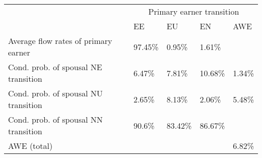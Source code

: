 \documentclass{article}
\begin{document}
\begin{tabular}{lllll}
\toprule
\multicolumn{1}{c}{ } & \multicolumn{4}{c}{Primary earner transition} \\
\cmidrule(l{3pt}r{3pt}){2-5}
 & EE & EU & EN & AWE\\
\midrule
Average flow rates of primary earner & 97.45\% & 0.95\% & 1.61\% & \\
\midrule
Cond. prob. of spousal NE transition & 6.47\% & 7.81\% & 10.68\% & 1.34\%\\
Cond. prob. of spousal NU transition & 2.65\% & 8.13\% & 2.06\% & 5.48\%\\
Cond. prob. of spousal NN transition & 90.6\% & 83.42\% & 86.67\% & \\
\midrule
AWE (total) &  &  &  & 6.82\%\\
\bottomrule
\end{tabular}
\end{document}
